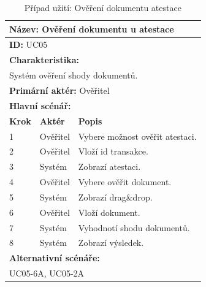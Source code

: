 \vspace{-1mm} %
\renewcommand{\arraystretch}{1.5} %
\begin{table}[h]
	\centering
	\begin{tabular}{|p{1cm}|p{2cm}|p{10cm}|}
		\hline
		\multicolumn{3}{|l|}{\textbf{Název:} Ověření dokumentu u atestace} \\ \hline
		\multicolumn{3}{|l|}{\textbf{ID:} UC05} \\ \hline
		\multicolumn{3}{|l|}{\textbf{Charakteristika:}} \\ \hline
		\multicolumn{3}{|l|}{Systém ověření shody dokumentů.} \\ \hline
		\multicolumn{3}{|l|}{\textbf{Primární aktér:} Ověřitel} \\ \hline
		\multicolumn{3}{|l|}{\textbf{Hlavní scénář:}} \\ \hline
		\textbf{Krok} & \textbf{Aktér} & \textbf{Popis} \\ \hline
		1 & Ověřitel  & Vybere možnost ověřit atestaci. \\ \hline
		2 & Ověřitel  & Vloží id transakce. \\ \hline
		3 & Systém    & Zobrazí atestaci. \\ \hline
		4 & Ověřitel  & Vybere ověřit dokument. \\ \hline
		5 & Systém    & Zobrazí drag\&drop. \\ \hline
		6 & Ověřitel  & Vloží dokument. \\ \hline
		7 & Systém    & Vyhodnotí shodu dokumentů. \\ \hline
		8 & Systém    & Zobrazí výsledek. \\ \hline
		
		\multicolumn{3}{|l|}{\textbf{Alternativní scénáře:}} \\ \hline
		\multicolumn{3}{|l|}{UC05-6A, UC05-2A} \\ \hline
		
	\end{tabular}
	\vspace{10pt} %
	\caption{Případ užití: Ověření dokumentu atestace}
	\label{tab:usecase-verify-attestation}
\end{table}
\renewcommand{\arraystretch}{1} %


